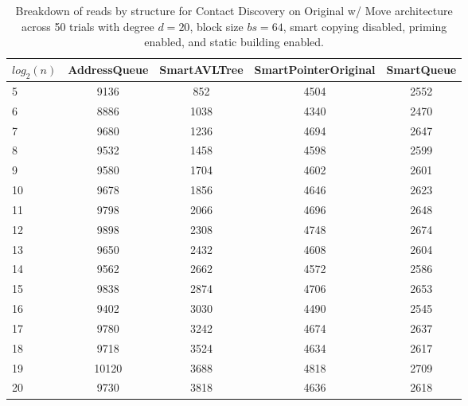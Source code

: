 \begin{table}[]
\centering
\begin{tabular}{|l|c|c|c|c|}
$log_2(n)$ & AddressQueue & SmartAVLTree & SmartPointerOriginal & SmartQueue \\ \hline
5 & 9136 & 852 & 4504 & 2552 \\ \hline
6 & 8886 & 1038 & 4340 & 2470 \\ \hline
7 & 9680 & 1236 & 4694 & 2647 \\ \hline
8 & 9532 & 1458 & 4598 & 2599 \\ \hline
9 & 9580 & 1704 & 4602 & 2601 \\ \hline
10 & 9678 & 1856 & 4646 & 2623 \\ \hline
11 & 9798 & 2066 & 4696 & 2648 \\ \hline
12 & 9898 & 2308 & 4748 & 2674 \\ \hline
13 & 9650 & 2432 & 4608 & 2604 \\ \hline
14 & 9562 & 2662 & 4572 & 2586 \\ \hline
15 & 9838 & 2874 & 4706 & 2653 \\ \hline
16 & 9402 & 3030 & 4490 & 2545 \\ \hline
17 & 9780 & 3242 & 4674 & 2637 \\ \hline
18 & 9718 & 3524 & 4634 & 2617 \\ \hline
19 & 10120 & 3688 & 4818 & 2709 \\ \hline
20 & 9730 & 3818 & 4636 & 2618 \\ \hline
\end{tabular}
\caption{Breakdown of reads by structure for Contact Discovery on Original w/ Move architecture across 50 trials with degree $d=20$, block size $bs=64$, smart copying disabled, priming enabled, and static building enabled.}
    \label{tab:reads_by_structure_cd_d20_bs64_trials50_copiesfalse_primetrue_staticinsertiontrue_ptoriginal_movetrue}
\end{table}

